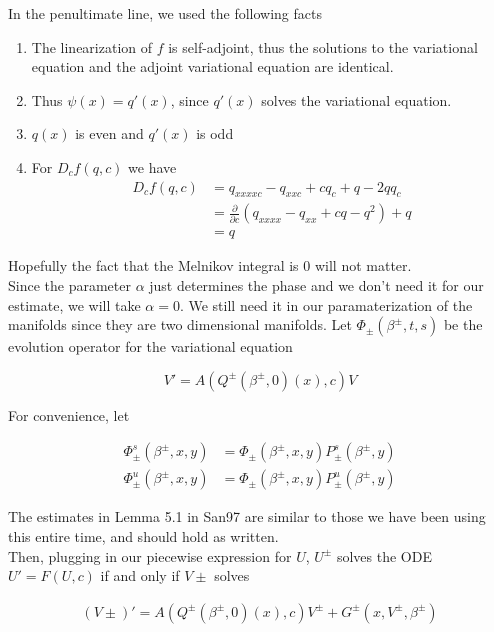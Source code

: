 \documentclass[12pt]{article}
\begin{document}
In the penultimate line, we used the following facts

\begin{enumerate}

\item The linearization of $f$ is self-adjoint, thus the solutions to the variational equation and the adjoint variational equation are identical.
\item Thus $\psi(x) = q'(x)$, since $q'(x)$ solves the variational equation.
\item $q(x)$ is even and $q'(x)$ is odd
\item For $D_c f(q, c)$ we have
\begin{align*}
D_c f(q, c) &= q_{xxxxc} - q_{xxc} + c q_c + q - 2qq_c \\
&= \frac{\partial}{\partial c}(q_{xxxx} - q_{xx} + cq - q^2) + q \\
&= q
\end{align*}

\end{enumerate}

Hopefully the fact that the Melnikov integral is 0 will not matter.\\

Since the parameter $\alpha$ just determines the phase and we don't need it for our estimate, we will take $\alpha = 0$. We still need it in our paramaterization of the manifolds since they are two dimensional manifolds. Let $\Phi_\pm(\beta^\pm, t, s)$ be the evolution operator for the variational equation

\begin{equation}
V' = A(Q^\pm(\beta^\pm, 0)(x), c) V
\end{equation}

For convenience, let

\begin{align*}
\Phi^s_\pm(\beta^\pm, x, y) &= \Phi_\pm(\beta^\pm, x, y) P^s_\pm(\beta^\pm, y) \\
\Phi^u_\pm(\beta^\pm, x, y) &= \Phi_\pm(\beta^\pm, x, y) P^u_\pm(\beta^\pm, y) 
\end{align*}

The estimates in Lemma 5.1 in San97 are similar to those we have been using this entire time, and should hold as written.\\

Then, plugging in our piecewise expression for $U$, $U^\pm$ solves the ODE $U' = F(U, c)$ if and only if $V\pm$ solves

\begin{align*}
(V\pm)' = A(Q^\pm(\beta^\pm, 0)(x), c)V^\pm + G^\pm(x, V^\pm, \beta^\pm) 
\end{align*}
\end{document}
